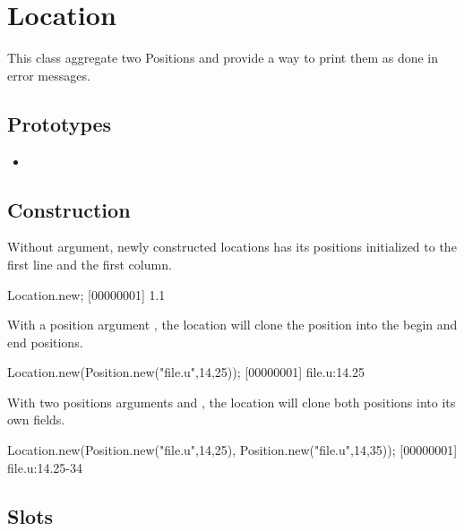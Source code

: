 \section{Location}

This class aggregate two Positions and provide a way to print them as done
in error messages.

\subsection{Prototypes}
\begin{itemize}
\item {}
\end{itemize}

\subsection{Construction}

Without argument, newly constructed locations has its positions initialized
to the first line and the first column.

\begin{urbiscript}
Location.new;
[00000001] 1.1
\end{urbiscript}

With a position argument , the location will clone the position into
the begin and end positions.

\begin{urbiscript}
Location.new(Position.new("file.u",14,25));
[00000001] file.u:14.25
\end{urbiscript}

With two positions arguments  and , the location will
clone both positions into its own fields.

\begin{urbiscript}
Location.new(Position.new("file.u",14,25), Position.new("file.u",14,35));
[00000001] file.u:14.25-34
\end{urbiscript}

\subsection{Slots}

